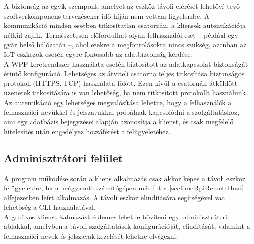 A biztonság az egyik szempont, amelyet az eszköz távoli elérését lehetővé tevő szoftverkomponens tervezésekor idő híján nem vettem figyelembe. A kommunikáció minden esetben titkosítatlan csatornán, a kliensek autentikációja nélkül zajlik. Természetesen előfordulhat olyan felhasználói eset -- például egy gyár belső hálózatán --, ahol ezekre a megfontolásokra nincs szükség, azonban az IoT eszközök esetén egyre fontosabb az adatbiztonság kérdése.\\
A WPF keretrendszer használata esetén biztosított az adatkapcsolat biztonságát érintő konfiguráció. Lehetséges az átviteli csatorna teljes titkosítása biztonságos protokoll (HTTPS, TCP) használata fölött. Ezen kívül a csatornán átküldött üzenetek titkosítására is van lehetőség, ha nem titkosított protokollt használunk.\\
Az autentikáció egy lehetséges megvalósítása lehetne, hogy a felhasználók a felhasználói nevükkel és jelszavukkal próbálnak kapcsolódni a szolgáltatáshoz, ami egy adatbázis bejegyzései alapján azonosítja a klienst, és csak megfelelő hitelesítés után engedélyez hozzáférést a felügyeletéhez.

\subsection{Adminisztrátori felület}

A program működése során a kliens alkalmazás csak akkor képes a távoli eszköz felügyeletére, ha a beágyazott számítógépen már fut a \ref{section:RpiRemoteHost} alfejezetben leírt alkalmazás. A távoli eszköz elindítására  segítségével van lehetőség a CLI használatával. \\
A grafikus kliensalkalmazást érdemes lehetne bővíteni egy adminisztrátori ablakkal, amelyben a távoli szolgáltatások konfigurációját, elindítását, valamint a felhasználói nevek és jelszavak kezelését lehetne elvégezni.
